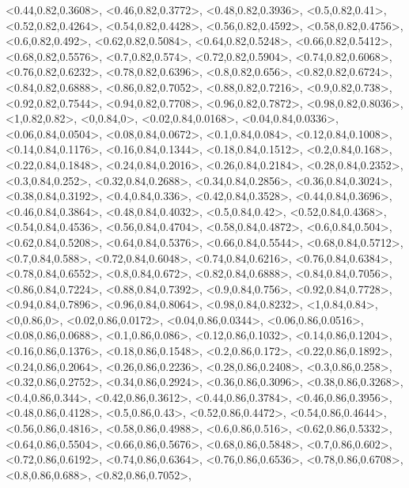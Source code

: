 \documentclass[a4paper,10pt]{article}
\begin{document}
\begin{eulernotebook}
\begin{euleroutput}
  <0.44,0.82,0.3608>,
  <0.46,0.82,0.3772>,
  <0.48,0.82,0.3936>,
  <0.5,0.82,0.41>,
  <0.52,0.82,0.4264>,
  <0.54,0.82,0.4428>,
  <0.56,0.82,0.4592>,
  <0.58,0.82,0.4756>,
  <0.6,0.82,0.492>,
  <0.62,0.82,0.5084>,
  <0.64,0.82,0.5248>,
  <0.66,0.82,0.5412>,
  <0.68,0.82,0.5576>,
  <0.7,0.82,0.574>,
  <0.72,0.82,0.5904>,
  <0.74,0.82,0.6068>,
  <0.76,0.82,0.6232>,
  <0.78,0.82,0.6396>,
  <0.8,0.82,0.656>,
  <0.82,0.82,0.6724>,
  <0.84,0.82,0.6888>,
  <0.86,0.82,0.7052>,
  <0.88,0.82,0.7216>,
  <0.9,0.82,0.738>,
  <0.92,0.82,0.7544>,
  <0.94,0.82,0.7708>,
  <0.96,0.82,0.7872>,
  <0.98,0.82,0.8036>,
  <1,0.82,0.82>,
  <0,0.84,0>,
  <0.02,0.84,0.0168>,
  <0.04,0.84,0.0336>,
  <0.06,0.84,0.0504>,
  <0.08,0.84,0.0672>,
  <0.1,0.84,0.084>,
  <0.12,0.84,0.1008>,
  <0.14,0.84,0.1176>,
  <0.16,0.84,0.1344>,
  <0.18,0.84,0.1512>,
  <0.2,0.84,0.168>,
  <0.22,0.84,0.1848>,
  <0.24,0.84,0.2016>,
  <0.26,0.84,0.2184>,
  <0.28,0.84,0.2352>,
  <0.3,0.84,0.252>,
  <0.32,0.84,0.2688>,
  <0.34,0.84,0.2856>,
  <0.36,0.84,0.3024>,
  <0.38,0.84,0.3192>,
  <0.4,0.84,0.336>,
  <0.42,0.84,0.3528>,
  <0.44,0.84,0.3696>,
  <0.46,0.84,0.3864>,
  <0.48,0.84,0.4032>,
  <0.5,0.84,0.42>,
  <0.52,0.84,0.4368>,
  <0.54,0.84,0.4536>,
  <0.56,0.84,0.4704>,
  <0.58,0.84,0.4872>,
  <0.6,0.84,0.504>,
  <0.62,0.84,0.5208>,
  <0.64,0.84,0.5376>,
  <0.66,0.84,0.5544>,
  <0.68,0.84,0.5712>,
  <0.7,0.84,0.588>,
  <0.72,0.84,0.6048>,
  <0.74,0.84,0.6216>,
  <0.76,0.84,0.6384>,
  <0.78,0.84,0.6552>,
  <0.8,0.84,0.672>,
  <0.82,0.84,0.6888>,
  <0.84,0.84,0.7056>,
  <0.86,0.84,0.7224>,
  <0.88,0.84,0.7392>,
  <0.9,0.84,0.756>,
  <0.92,0.84,0.7728>,
  <0.94,0.84,0.7896>,
  <0.96,0.84,0.8064>,
  <0.98,0.84,0.8232>,
  <1,0.84,0.84>,
  <0,0.86,0>,
  <0.02,0.86,0.0172>,
  <0.04,0.86,0.0344>,
  <0.06,0.86,0.0516>,
  <0.08,0.86,0.0688>,
  <0.1,0.86,0.086>,
  <0.12,0.86,0.1032>,
  <0.14,0.86,0.1204>,
  <0.16,0.86,0.1376>,
  <0.18,0.86,0.1548>,
  <0.2,0.86,0.172>,
  <0.22,0.86,0.1892>,
  <0.24,0.86,0.2064>,
  <0.26,0.86,0.2236>,
  <0.28,0.86,0.2408>,
  <0.3,0.86,0.258>,
  <0.32,0.86,0.2752>,
  <0.34,0.86,0.2924>,
  <0.36,0.86,0.3096>,
  <0.38,0.86,0.3268>,
  <0.4,0.86,0.344>,
  <0.42,0.86,0.3612>,
  <0.44,0.86,0.3784>,
  <0.46,0.86,0.3956>,
  <0.48,0.86,0.4128>,
  <0.5,0.86,0.43>,
  <0.52,0.86,0.4472>,
  <0.54,0.86,0.4644>,
  <0.56,0.86,0.4816>,
  <0.58,0.86,0.4988>,
  <0.6,0.86,0.516>,
  <0.62,0.86,0.5332>,
  <0.64,0.86,0.5504>,
  <0.66,0.86,0.5676>,
  <0.68,0.86,0.5848>,
  <0.7,0.86,0.602>,
  <0.72,0.86,0.6192>,
  <0.74,0.86,0.6364>,
  <0.76,0.86,0.6536>,
  <0.78,0.86,0.6708>,
  <0.8,0.86,0.688>,
  <0.82,0.86,0.7052>,

\end{euleroutput}
\end{eulernotebook}
\end{document}
